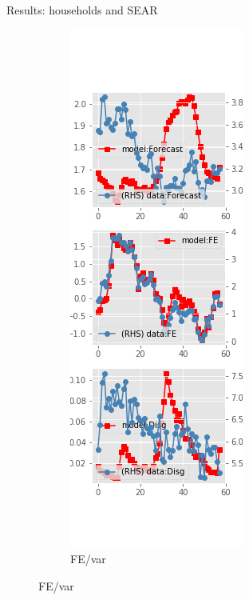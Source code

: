 \documentclass{beamer}
\begin{document}
\begin{frame}{Results: households and SEAR}
\begin{figure}[ht]
\begin{subfigure}[b]{0.19\textwidth}
\end{subfigure}
\hfill
\begin{subfigure}[b]{0.19\textwidth}
	\caption{FE/var}
	\includegraphics[width=\textwidth, height = 0.8\textheight]{figuresDraft/sce_se_est_diag3.png}

\end{subfigure}
\end{figure}
\end{frame}
\end{document}

